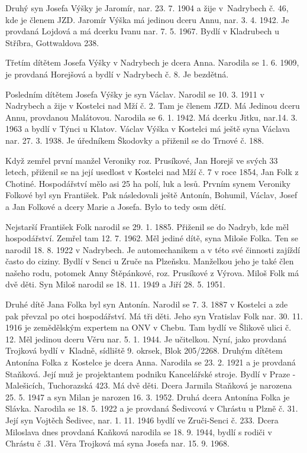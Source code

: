 \documentclass[../dejiny-rodu-prusiku.tex]{subfiles}
\begin{document}
Druhý syn Josefa Výšky je Jaromír, nar. 23. 7. 1904 a žije v Nadrybech č. 46, kde je členem JZD. Jaromír Výška má jedinou dceru Annu, nar. 3. 4. 1942. Je provdaná Lojdová a má dcerku Ivanu nar. 7. 5. 1967. Bydlí v Kladrubech u Stříbra, Gottwaldova 238.

Třetím dítětem Josefa Výšky v Nadrybech je dcera Anna. Narodila se 1. 6. 1909, je provdaná Horejšová a bydlí v Nadrybech č. 8. Je bezdětná.

Posledním dítětem Josefa Výšky je syn Václav. Narodil se 10. 3. 1911 v Nadrybech a žije v Kostelci nad Mží č. 2. Tam je členem JZD. Má Jedinou dceru Annu, provdanou Malátovou. Narodila se 6. 1. 1942. Má dcerku Jitku, nar.14. 3. 1963 a bydlí v Týnci u Klatov. Václav Výška v Kostel­ci má ještě syna Václava nar. 27. 3. 1938. Je úředníkem Škodovky a přiženil se do Trnové č. 188.

Když zemřel první manžel Veroniky roz. Prusíkové, Jan Horejš ve svých 33 letech, přiženil se na její usedlost v Kostelci nad Mží č. 7 v roce 1854, Jan Folk z Chotiné. Hospodářství mělo asi 25 ha polí, luk a lesů. Prvním synem Veroniky Folkové byl syn František. Pak následovali ještě Antonín, Bohumil, Václav, Josef a Jan Folkové a dcery Marie a Josefa. Bylo to tedy osm dětí.

Nejstarší František Folk narodil se 29. 1. 1885. Přiženil se do Nadryb, kde měl hospodářství. Zemřel tam 12. 7. 1962. Měl jediné dítě, syna Miloše Folka. Ten se narodil 18. 8. 1922 v Nadrybech. Je automechanikem a v této své činnosti zajíždí často do ciziny. Bydlí v Senci u Zruče na Plzeňsku. Manželkou jeho je také člen našeho rodu, potomek Anny Štěpánkové, roz. Prusíkové z Výrova. Miloš Folk má dvě děti. Syn Miloš narodil se 18. 11. 1949 a Jiří 28. 5. 1951.

Druhé dítě Jana Folka byl syn Antonín. Narodil se 7. 3. 1887 v Kostelci a zde pak převzal po otci hospodářství. Má tři děti. Jeho syn Vratislav Folk nar. 30. 11. 1916 je zemědělským expertem na ONV v Chebu. Tam bydlí ve Šlikově ulici­ č. 12. Měl jedinou dceru Věru nar. 5. 1. 1944. Je učitelkou. Nyní, jako provdaná Trojková bydlí v Kladně, sídliště 9. okrsek, Blok 205/2268.  Druhým dítětem Antonína Folka z Kostelce je dcera Anna. Narodila se 23. 2. 1921 a je provdaná Staňková. Její muž je projektantem podniku Kancelářské stroje. Bydlí v Praze - Malešicích, Tuchorazská 423. Má dvě děti. Dcera Jarmila Staňková je narozena 25. 5. 1947 a syn Milan je narozen 16. 3. 1952. Druhá dcera Antonína Folka je Slávka. Narodila se 18. 5. 1922 a je provdaná Šedivcová v Chrástu u Plzně č. 31. Její syn Vojtěch Še­divec, nar. 1. 11. 1946 bydlí ve Zruči-Senci č. 233. Dcera Miloslava dnes provdaná Kaňková narodila se 18. 9. 1944, bydlí s rodiči v Chrástu č .31. Věra Trojková má syna Josefa nar. 15. 9. 1968.
\end{document}
